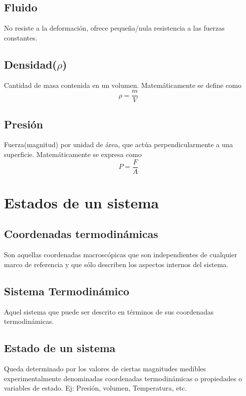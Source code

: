 \documentclass[12pt,twocolumn,a4paper]{report}
\begin{document}
	\section*{Fluido}
	No resiste a la deformación, ofrece pequeña/nula resistencia a las fuerzas constantes. 
	\section*{Densidad($\rho$)}
	Cantidad de masa contenida en un volumen. Matemáticamente se define como
	\begin{equation*}
	\rho = \frac{m}{V}
	\end{equation*}
	\section*{Presión}
	Fuerza(magnitud) por unidad de área, que actúa perpendicularmente a una superficie. Matemáticamente se expresa como
	\begin{equation*}
	P = \frac{F}{A}
	\end{equation*}
	
	
		 
\onecolumn

\chapter*{Estados de un sistema}
\section*{Coordenadas termodinámicas}
Son aquellas coordenadas macroscópicas que son independientes de cualquier marco de referencia y que sólo describen los aspectos internos del sistema.
\section*{Sistema Termodinámico}
Aquel sistema que puede ser descrito en términos de sus coordenadas termodinámicas.
\section*{Estado de un sistema}
Queda determinado por los valores de ciertas magnitudes medibles experimentalmente denominadas coordenadas termodinámicas o propiedades o variables de estado. Ej: Presión, volumen, Temperatura, etc.
\end{document}
